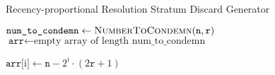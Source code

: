 \begin{algorithm}
\caption{Recency-proportional Resolution Stratum Discard Generator}
\label{alg:recency-proportional-algo-gen-drop-ranks}
    \begin{algorithmic}
    \end{algorithmic}
        
    \begin{algorithmic}[1]
            \STATE{} 
        \ELSE 
            \STATE{}
        \ENDIF
    \end{algorithmic}
    \EndProcedure

    \begin{algorithmic}[1]
        \STATE $\texttt{num\_to\_condemn} \gets \Call{NumberToCondemn}{\texttt{n}, \texttt{r}}$
        \STATE $\texttt{arr} \gets \text{empty array of length num\_to\_condemn}$

        \STATE $\texttt{arr} [$i$] \gets \texttt{n} - 2^{i} \cdot (2 \texttt{r} + 1)$
        \ENDFOR
    \end{algorithmic}
\end{algorithm}
